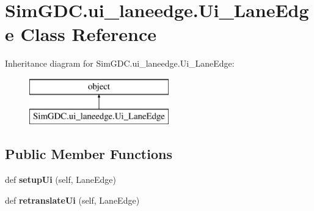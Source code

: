 \hypertarget{class_sim_g_d_c_1_1ui__laneedge_1_1_ui___lane_edge}{}\section{Sim\+G\+D\+C.\+ui\+\_\+laneedge.\+Ui\+\_\+\+Lane\+Edge Class Reference}
\label{class_sim_g_d_c_1_1ui__laneedge_1_1_ui___lane_edge}
Inheritance diagram for Sim\+G\+D\+C.\+ui\+\_\+laneedge.\+Ui\+\_\+\+Lane\+Edge\+:\begin{figure}[H]
\begin{center}
\leavevmode
\includegraphics[height=2.000000cm]{class_sim_g_d_c_1_1ui__laneedge_1_1_ui___lane_edge}
\end{center}
\end{figure}
\subsection*{Public Member Functions}
\begin{DoxyCompactItemize}
\item 
\hypertarget{class_sim_g_d_c_1_1ui__laneedge_1_1_ui___lane_edge_ab8f65fdca7aee1e47cfb149b5d5aca0f}{}def {\bfseries setup\+Ui} (self, Lane\+Edge)\label{class_sim_g_d_c_1_1ui__laneedge_1_1_ui___lane_edge_ab8f65fdca7aee1e47cfb149b5d5aca0f}

\item 
\hypertarget{class_sim_g_d_c_1_1ui__laneedge_1_1_ui___lane_edge_a2620fdbe077dcc066de37ab33b82c683}{}def {\bfseries retranslate\+Ui} (self, Lane\+Edge)\label{class_sim_g_d_c_1_1ui__laneedge_1_1_ui___lane_edge_a2620fdbe077dcc066de37ab33b82c683}

\end{DoxyCompactItemize}
